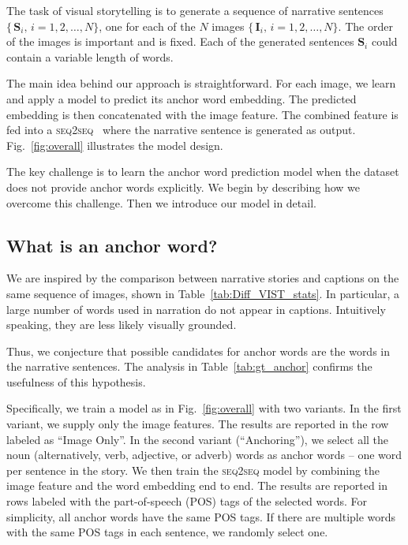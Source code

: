 The task of visual storytelling is to generate a sequence of narrative sentences $\{ \, \mathbf{S}_i, \, i=1, 2, \ldots, {N}\}$, one for each of the $N$ images $\{ \, \mathbf{I}_i, \, i=1, 2, \ldots, {N}\}$. The order of the images is important and is fixed. Each of the generated sentences $\mathbf{S}_i$ could contain a variable length of words.

The main idea behind our approach is straightforward. For each image, we learn and apply a model to predict its anchor word embedding. The predicted embedding is then concatenated with the image feature. The combined feature is fed into a \textsc{seq2seq}~\cite{sutskever2014sequence} where the narrative sentence is generated as output. Fig.~\ref{fig:overall} illustrates the model design.

The key challenge is to learn the anchor word prediction model when the dataset does not provide anchor words explicitly. We begin by describing how we overcome this challenge. Then we introduce our model in detail.

\subsection{What is an anchor word?}

We are inspired by the comparison between narrative stories and captions on the same sequence of images, shown in Table~\ref{tab:Diff_VIST_stats}.  In particular, a large number of words used in narration do not appear in captions. Intuitively speaking, they are less likely visually grounded.

Thus, we conjecture that possible candidates for anchor words are the words in the narrative sentences. The analysis in Table~\ref{tab:gt_anchor} confirms the usefulness of this hypothesis.

Specifically,  we train a model as in Fig.~\ref{fig:overall} with two variants. In the first variant, we supply only the image features. The results are reported in the row labeled as ``Image Only''.   In the second variant (``Anchoring''), we select all the noun (alternatively, verb, adjective, or adverb) words as anchor words -- one word per sentence in the story. We then train the \textsc{seq2seq} model by combining the image feature and the word embedding end to end.  The results are reported in rows labeled with the part-of-speech  (POS) tags of the selected words. For simplicity, all anchor words have the same POS tags. If there are multiple words with the same POS tags in each sentence, we randomly select one.

